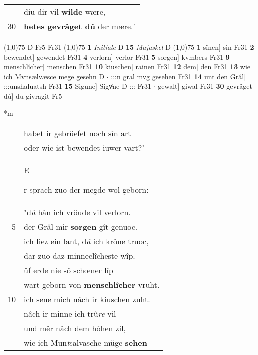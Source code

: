 \documentclass[8pt,a4paper,notitlepage]{article}
\begin{document}
\begin{table}[ht]
\begin{minipage}[t]{0.5\linewidth}
\begin{tabular}{rl}
 & diu dir vil \textbf{wilde} wære,\\ 
30 & \textbf{hetes gevrâget dû} der mære."\\ 
\end{tabular}
\scriptsize
\line(1,0){75} \newline
D Fr5 Fr31 \newline
\line(1,0){75} \newline
\textbf{1} \textit{Initiale} D  \textbf{15} \textit{Majuskel} D  \newline
\line(1,0){75} \newline
\textbf{1} sînen] sin Fr31 \textbf{2} bewendet] gewendet Fr31 \textbf{4} verlorn] verlor Fr31 \textbf{5} sorgen] kvmbers Fr31 \textbf{9} menschlîcher] menschen Fr31 \textbf{10} kiuschen] rainen Fr31 \textbf{12} dem] den Fr31 \textbf{13} wie ich Mvnsælvæsce mege gesehn D  $\cdot$ :::n gral mvg gesehen Fr31 \textbf{14} unt den Grâl] :::unshaluatsh Fr31 \textbf{15} Sigune] Sigvͦne D ::: Fr31  $\cdot$ gewalt] giwal Fr31 \textbf{30} gevrâget dû] du givragit Fr5 \newline
\end{minipage}
\hspace{0.5cm}
\begin{minipage}[t]{0.5\linewidth}
\small
\begin{center}*m
\end{center}
\begin{tabular}{rl}
 & habet ir gebrüefet noch sîn art\\ 
 & oder wie ist bewendet iuwer vart?"\\ 
 & \begin{large}E\end{large}r sprach zuo der megde wol geborn:\\ 
 & "d\textit{â} hân ich vröude vil verlorn.\\ 
5 & der Grâl mir \textbf{sorgen} gît genuoc.\\ 
 & ich liez ein lant, d\textit{â} ich krône truoc,\\ 
 & dar zuo daz minneclîcheste wîp.\\ 
 & ûf erde nie sô schœner lîp\\ 
 & wart geborn von \textbf{menschlîcher} vruht.\\ 
10 & ich sene mich nâch ir kiuschen zuht.\\ 
 & nâch ir minne ich trû\textit{re} vil\\ 
 & und mêr nâch dem hôhen zil,\\ 
 & wie ich Mun\textit{t}salvasche müge \textbf{sehen}\\ 

\end{tabular}
\end{minipage}
\end{table}
\end{document}
